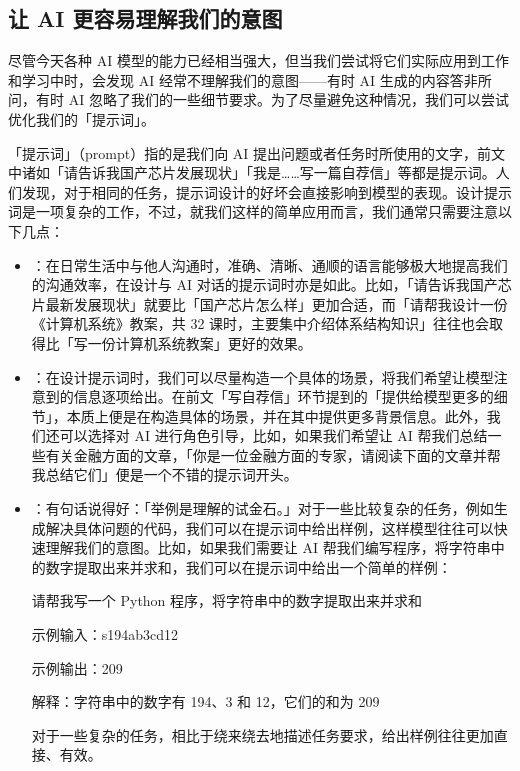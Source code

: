 \subsection{让 AI 更容易理解我们的意图}

尽管今天各种 AI 模型的能力已经相当强大，但当我们尝试将它们实际应用到工作和学习中时，会发现 AI 经常不理解我们的意图——有时 AI 生成的内容答非所问，有时 AI 忽略了我们的一些细节要求。为了尽量避免这种情况，我们可以尝试优化我们的「提示词」。

「提示词」（prompt）指的是我们向 AI 提出问题或者任务时所使用的文字，前文中诸如「请告诉我国产芯片发展现状」「我是……写一篇自荐信」等都是提示词。人们发现，对于相同的任务，提示词设计的好坏会直接影响到模型的表现。设计提示词是一项复杂的工作，不过，就我们这样的简单应用而言，我们通常只需要注意以下几点：

\begin{itemize}
  \item {}：在日常生活中与他人沟通时，准确、清晰、通顺的语言能够极大地提高我们的沟通效率，在设计与 AI 对话的提示词时亦是如此。比如，「请告诉我国产芯片最新发展现状」就要比「国产芯片怎么样」更加合适，而「请帮我设计一份《计算机系统》教案，共 32 课时，主要集中介绍体系结构知识」往往也会取得比「写一份计算机系统教案」更好的效果。
  \item {}：在设计提示词时，我们可以尽量构造一个具体的场景，将我们希望让模型注意到的信息逐项给出。在前文「写自荐信」环节提到的「提供给模型更多的细节」，本质上便是在构造具体的场景，并在其中提供更多背景信息。此外，我们还可以选择对 AI 进行角色引导，比如，如果我们希望让 AI 帮我们总结一些有关金融方面的文章，「你是一位金融方面的专家，请阅读下面的文章并帮我总结它们」便是一个不错的提示词开头。
  \item {}：有句话说得好：「举例是理解的试金石。」对于一些比较复杂的任务，例如生成解决具体问题的代码，我们可以在提示词中给出样例，这样模型往往可以快速理解我们的意图。比如，如果我们需要让 AI 帮我们编写程序，将字符串中的数字提取出来并求和，我们可以在提示词中给出一个简单的样例：
    \begin{quoting}
      请帮我写一个 Python 程序，将字符串中的数字提取出来并求和\par
      \phantom{text}\par
      示例输入：s194ab3cd12\par
      示例输出：209\par
      解释：字符串中的数字有 194、3 和 12，它们的和为 209\par
    \end{quoting}
    对于一些复杂的任务，相比于绕来绕去地描述任务要求，给出样例往往更加直接、有效。
\end{itemize}

